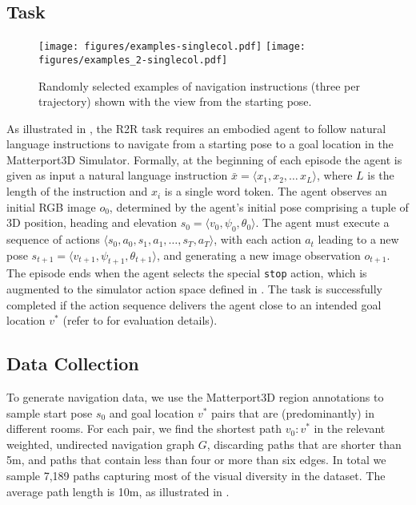 \documentclass[10pt,twocolumn,letterpaper]{article}
\begin{document}
\subsection{Task}

\begin{figure}[t]
	\begin{center}
		\texttt{[image: figures/examples-singlecol.pdf]}
		\texttt{[image: figures/examples\_2-singlecol.pdf]}
	\end{center}
	\caption{Randomly selected examples of navigation instructions (three per trajectory) shown with the view from the starting pose.}
	\label{fig:examples}
\end{figure}

As illustrated in , the R2R task requires an embodied agent to follow natural language instructions to navigate from a starting pose to a goal location in the Matterport3D Simulator. Formally, at the beginning of each episode the agent is given as input a natural language instruction $\bar{x}= \langle x_1,x_2,\dots\,x_L \rangle $, where $L$ is the length of the instruction and $x_i$ is a single word token. The agent observes an initial RGB image $o_0$, determined by the agent's initial pose comprising a tuple of 3D position, heading and elevation $s_0 = \langle v_0, \psi_0, \theta_0 \rangle$. The agent must execute a sequence of actions $ \langle s_0,a_0,s_1,a_1,\dots,s_T,a_T \rangle $, with each action $a_t$ leading to a new pose $s_{t+1} = \langle v_{t+1}, \psi_{t+1}, \theta_{t+1} \rangle$, and generating a new image observation $o_{t+1}$. The episode ends when the agent selects the special \texttt{stop} action, which is augmented to the simulator action space defined in . The task is successfully completed if the action sequence delivers the agent close to an intended goal location $v^*$ (refer to  for evaluation details). 


\subsection{Data Collection}
\label{sec:collection}

To generate navigation data, we use the Matterport3D region annotations to sample start pose $s_0$ and goal location $v^*$ pairs that are (predominantly) in different rooms. For each pair, we find the shortest path $v_0:v^*$ in the relevant weighted, undirected navigation graph $G$, discarding paths that are shorter than 5m, and paths that contain less than four or more than six edges. In total we sample 7,189 paths capturing most of the visual diversity in the dataset. The average path length is 10m, as illustrated in .
\end{document}
